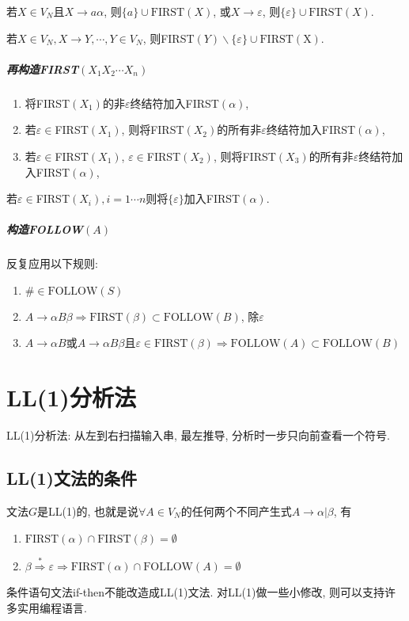                     若$X\in V_N$且$X\to a\alpha$, 则$\{a\}\cup \mathrm{FIRST}(X)$, 或$X\to \varepsilon$, 则$\{\varepsilon\}\cup \mathrm{FIRST}(X)$. 
                    
                    若$X\in V_N, X\to Y,\cdots, Y\in V_N$, 则FIRST$(Y)\backslash\{\varepsilon\}\cup \mathrm{FIRST(X)}$.

                \subparagraph{再构造FIRST$(X_1X_2\cdots X_n)$}

                    \begin{enumerate}
                        \item 将FIRST$(X_1)$的非$\varepsilon$终结符加入FIRST$(\alpha)$,
                        \item 若$\varepsilon\in$FIRST$(X_1)$, 则将FIRST$(X_2)$的所有非$\varepsilon$终结符加入FIRST$(\alpha)$,
                        \item 若$\varepsilon\in$FIRST$(X_1)$, $\varepsilon\in$FIRST$(X_2)$, 则将FIRST$(X_3)$的所有非$\varepsilon$终结符加入FIRST$(\alpha)$,
                    \end{enumerate}
                    若$\varepsilon\in$FIRST$(X_i), i=1\cdots n$则将$\{\varepsilon\}$加入FIRST$(\alpha)$.

                \subparagraph{构造FOLLOW$(A)$}

                    反复应用以下规则:

                    \begin{enumerate}
                        \item $\#\in\textrm{FOLLOW}(S)$
                        \item $A\to \alpha B\beta\Rightarrow\textrm{FIRST}(\beta)\subset\textrm{FOLLOW}(B)$, 除$\varepsilon$
                        \item $A\to \alpha B$或$A\to \alpha B\beta$且$\varepsilon\in\textrm{FIRST}(\beta)\Rightarrow\textrm{FOLLOW}(A)\subset\textrm{FOLLOW}(B)$
                    \end{enumerate}

    \section{LL(1)分析法}

        \textsf{LL(1)分析法}: 从左到右扫描输入串, 最左推导, 分析时一步只向前查看一个符号.

        \subsection{LL(1)文法的条件}

            文法$G$是LL(1)的, 也就是说$\forall A\in V_N$的任何两个不同产生式$A\to \alpha|\beta$, 有
            \begin{enumerate}
                \item $\textrm{FIRST}(\alpha)\cap\textrm{FIRST}(\beta)=\emptyset$
                \item $\beta\stackrel{*}{\Rightarrow}\varepsilon\Rightarrow\textrm{FIRST}(\alpha)\cap\textrm{FOLLOW}(A)=\emptyset$
            \end{enumerate}

            条件语句文法if-then不能改造成LL(1)文法. 对LL(1)做一些小修改, 则可以支持许多实用编程语言.

